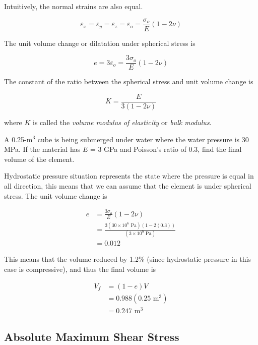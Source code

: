 \documentclass[
10pt,
a4paper,
openany,
svgnames,
]{book} %
\begin{document}
Intuitively, the normal strains are also equal.

\[\varepsilon _x = \varepsilon _y = \varepsilon _z = \varepsilon _o = \frac{\sigma _o}{E}(1 - 2\nu )\]

The unit volume change or dilatation under spherical stress is

\begin{equation}
  e = 3\varepsilon_o = \frac{3\sigma_o}{E}(1 - 2\nu )
\end{equation}

The constant of the ratio between the spherical stress and unit volume change is

\begin{equation}
  K = \frac{E}{3(1 - 2\nu )}
\end{equation}

where $K$ is called the \emph{volume modulus of elasticity} or \emph{bulk modulus}.

\begin{example}
A 0.25-m$^3$ cube is being submerged under water where the water pressure is 30 MPa. If the material has $E$ = 3 GPa and Poisson’s ratio of 0.3, find the final volume of the element.
\end{example}
\begin{solution}
Hydrostatic pressure situation represents the state where the pressure is equal in all direction, this means that we can assume that the element is under spherical stress. The unit volume change is

\begin{align*}
  e &= \frac{3\sigma_o}{E}(1 - 2\nu ) \\ 
    &= \frac{3(30 \times 10^6 \text{ Pa})(1 - 2(0.3))}{(3 \times 10^9 \text{ Pa})} \\ 
    &= 0.012 
\end{align*}	

This means that the volume reduced by 1.2\% (since hydrostatic pressure in this case is compressive), and thus the final volume is

\begin{align*}
  V_f &= (1 - e)V \\ 
      &= 0.988(0.25 \text{ m}^3) \\ 
      &= 0.247 \text{ m}^3
\end{align*}

\end{solution}

\subsection{Absolute Maximum Shear Stress}
\end{document}
